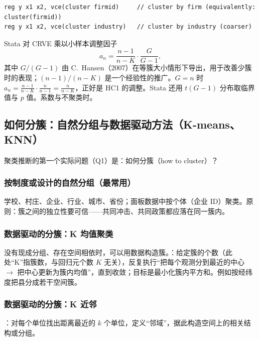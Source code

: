 \begin{lstlisting}
reg y x1 x2, vce(cluster firmid)     // cluster by firm (equivalently: cluster(firmid))
reg y x1 x2, vce(cluster industry)   // cluster by industry (coarser)
\end{lstlisting}
Stata 对 CRVE 乘以小样本调整因子
\[
a_n=\frac{n-1}{n-K}\cdot\frac{G}{G-1},
\]
其中 $G/(G-1)$ 由 C.~Hansen（2007）在等簇大小情形下导出，用于改善少簇时的表现；$(n-1)/(n-K)$ 是一个经验性的推广。$G=n$ 时 $a_n=\frac{n-1}{n-K}\cdot\frac{n}{n-1}=\frac{n}{n-K}$，正好是 HC1 的调整。Stata 还用 $t(G-1)$ 分布取临界值与 $p$ 值。系数与不聚类时。

\subsection{如何分簇：自然分组与数据驱动方法（K-means、KNN）}

聚类推断的第一个实际问题（Q1）是：如何分簇（how to cluster）？

\subsubsection{按制度或设计的自然分组（最常用）}

学校、村庄、企业、行业、城市、省份；面板数据中按个体（企业 ID）聚类。原则：簇之间的独立性要可信——共同冲击、共同政策都应落在同一簇内。

\subsubsection{数据驱动的分簇：K 均值聚类}

没有现成分组、存在空间相依时，可以用数据构造簇。：给定簇的个数（此处“K”指簇数，与回归元个数 $K$ 无关），反复执行“把每个观测分到最近的中心 $\to$ 把中心更新为簇内均值”，直到收敛；目标是最小化簇内平方和。例如按经纬度把县分成若干空间簇。

\subsubsection{数据驱动的分簇：K 近邻}

：对每个单位找出距离最近的 $k$ 个单位，定义“邻域”，据此构造空间上的相关结构或分组。

